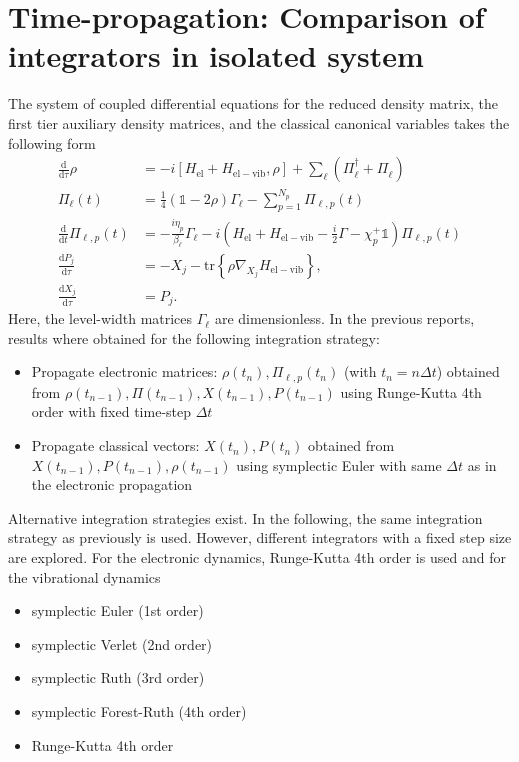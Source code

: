 \documentclass{article}
\newcommand{\dif}{\mathrm{d}}
\newcommand{\tr}[1]{\mathrm{tr}\left\{#1\right\}}
\begin{document}
\section{Time-propagation: Comparison of integrators in isolated system}\label{sec:3TimePropagation}
The system of coupled differential equations for the reduced density matrix, the first tier auxiliary density matrices, and the classical canonical variables takes the following form
\begin{align*}
	\frac{\dif}{\dif \tau}\rho &= -i[H_\mathrm{el}+H_\mathrm{el-vib},\rho] + \sum_\ell (\Pi_\ell^\dagger + \Pi_\ell^{\phantom{\dagger}}) \\
	\Pi_\ell(t) &= \frac{1}{4}(\mathds{1}-2\rho)\Gamma_\ell-\sum_{p=1}^{N_p} \Pi_{\ell,p}(t)\\
	\frac{\dif}{\dif t} \Pi_{\ell,p}(t) &= -\frac{i\eta_p}{\beta_\ell}\Gamma_\ell - i\left(H_\mathrm{el}+H_\mathrm{el-vib}-\frac{i}{2}\Gamma-\chi_p^+\mathds{1}\right)\Pi_{\ell,p}(t)\\
	\frac{\dif P_j}{\dif \tau}&= -X_j - \tr{\rho \nabla_{X_j}H_\mathrm{el-vib}}, \\
	\frac{\dif X_j}{\dif \tau} &=  P_j.
\end{align*}
Here, the level-width matrices $\Gamma_\ell$ are dimensionless.
In the previous reports, results where obtained for the following integration strategy:
\begin{itemize}
	\item[i.] Propagate electronic matrices: $\rho(t_n) , \Pi_{\ell,p}(t_n)$ (with $t_n = n\Delta t$) obtained from $\rho(t_{n-1}),\Pi(t_{n-1}), X(t_{n-1}),P(t_{n-1})$ using  Runge-Kutta 4th order with fixed time-step $\Delta t$
	\item[ii.] Propagate classical vectors: $X(t_n),P(t_n)$ obtained from $X(t_{n-1}),P(t_{n-1}),\rho(t_{n-1})$ using symplectic Euler with same $\Delta t$ as in the electronic propagation
\end{itemize}
Alternative integration strategies exist. In the following, the same integration strategy as previously is used. However, different integrators with a fixed step size are explored. For the electronic dynamics, Runge-Kutta 4th order is used and for the vibrational dynamics 
\begin{itemize}
	\item[1.] symplectic Euler (1st order) 
	\item[2.] symplectic Verlet (2nd order) 
	\item[3.] symplectic Ruth (3rd order) \cite{ruth1983canonical}
	\item[4.] symplectic Forest-Ruth (4th order)\cite{forest1990fourth}
	\item[5.] Runge-Kutta 4th order
\end{itemize}
\end{document}
